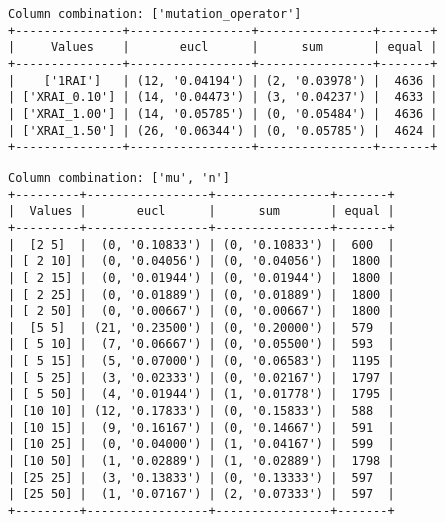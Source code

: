 \documentclass{article}
\begin{document}
\begin{verbatim}
Column combination: ['mutation_operator']
+---------------+-----------------+----------------+-------+
|     Values    |       eucl      |      sum       | equal |
+---------------+-----------------+----------------+-------+
|    ['1RAI']   | (12, '0.04194') | (2, '0.03978') |  4636 |
| ['XRAI_0.10'] | (14, '0.04473') | (3, '0.04237') |  4633 |
| ['XRAI_1.00'] | (14, '0.05785') | (0, '0.05484') |  4636 |
| ['XRAI_1.50'] | (26, '0.06344') | (0, '0.05785') |  4624 |
+---------------+-----------------+----------------+-------+
\end{verbatim}

\begin{verbatim}
Column combination: ['mu', 'n']
+---------+-----------------+----------------+-------+
|  Values |       eucl      |      sum       | equal |
+---------+-----------------+----------------+-------+
|  [2 5]  |  (0, '0.10833') | (0, '0.10833') |  600  |
| [ 2 10] |  (0, '0.04056') | (0, '0.04056') |  1800 |
| [ 2 15] |  (0, '0.01944') | (0, '0.01944') |  1800 |
| [ 2 25] |  (0, '0.01889') | (0, '0.01889') |  1800 |
| [ 2 50] |  (0, '0.00667') | (0, '0.00667') |  1800 |
|  [5 5]  | (21, '0.23500') | (0, '0.20000') |  579  |
| [ 5 10] |  (7, '0.06667') | (0, '0.05500') |  593  |
| [ 5 15] |  (5, '0.07000') | (0, '0.06583') |  1195 |
| [ 5 25] |  (3, '0.02333') | (0, '0.02167') |  1797 |
| [ 5 50] |  (4, '0.01944') | (1, '0.01778') |  1795 |
| [10 10] | (12, '0.17833') | (0, '0.15833') |  588  |
| [10 15] |  (9, '0.16167') | (0, '0.14667') |  591  |
| [10 25] |  (0, '0.04000') | (1, '0.04167') |  599  |
| [10 50] |  (1, '0.02889') | (1, '0.02889') |  1798 |
| [25 25] |  (3, '0.13833') | (0, '0.13333') |  597  |
| [25 50] |  (1, '0.07167') | (2, '0.07333') |  597  |
+---------+-----------------+----------------+-------+
\end{verbatim}
\end{document}

